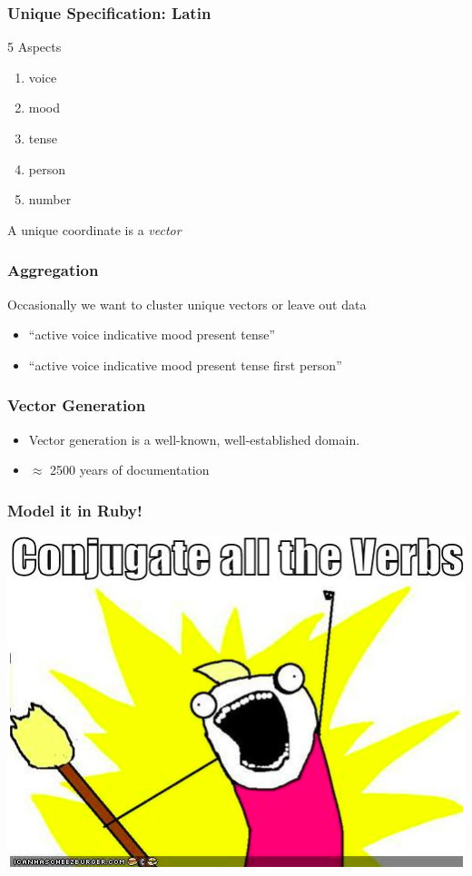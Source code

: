 \documentclass[slidestop,compress,mathserif]{beamer}
\begin{document}
\begin{frame}
	\frametitle{Unique Specification:  Latin}
	5 Aspects
	\begin{enumerate}
		\item voice
		\pause
		\item mood
		\pause
		\item tense
		\pause
		\item person
		\pause
		\item number
		\pause
	\end{enumerate}
	\vskip 0.5cm
	A unique coordinate is a \emph{vector}
\end{frame}

\begin{frame}
	\frametitle{Aggregation}
	Occasionally we want to cluster unique vectors or leave out data
	\pause
	\begin{itemize}
		\item ``active voice indicative mood present tense''
		\pause
		\item ``active voice indicative mood present tense first person''
	\end{itemize}
\end{frame}

\begin{frame}
	\frametitle{Vector Generation}
	\begin{itemize}
		\item Vector generation is a well-known, well-established domain.
		\item $\approx$ 2500 years of documentation
	\end{itemize}
\end{frame}

\begin{frame}
	\frametitle{Model it in Ruby!}
	\begin{center}
		\includegraphics[scale=0.45]{img/brosh_all.png}
	\end{center}	
\end{frame}
\end{document}

